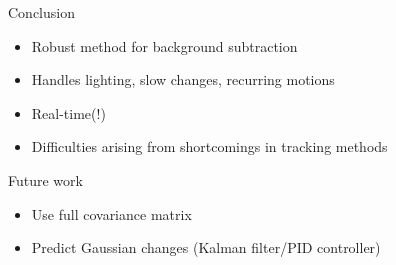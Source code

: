 \documentclass{beamer}
\begin{document}
\begin{frame}{Conclusion}
\begin{itemize}
\item Robust method for background subtraction
\item Handles lighting, slow changes, recurring motions
\item Real-time(!)
\item Difficulties arising from shortcomings in tracking methods
\end{itemize}

Future work
\begin{itemize}
\item Use full covariance matrix
\item Predict Gaussian changes (Kalman filter/PID controller)
\end{itemize}
\end{frame}

\end{document}
